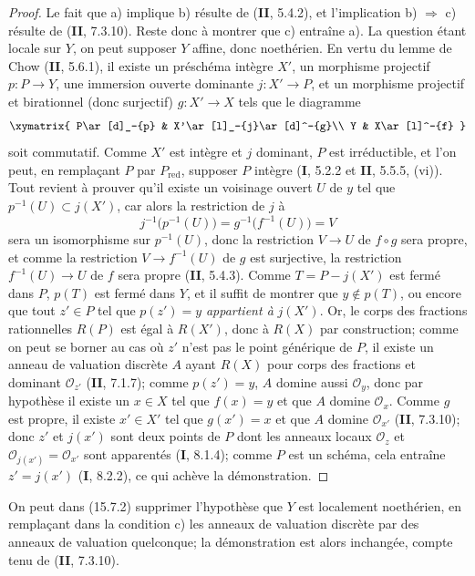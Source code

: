 \begin{proof}
Le fait que a) implique b) résulte de (\textbf{II}, 5.4.2), et l'implication b) $\Rightarrow$ c) résulte de (\textbf{II}, 7.3.10). Reste donc à montrer que c) entraîne a). La question étant locale sur $Y$, on peut supposer $Y$ affine, donc noethérien. En vertu du lemme de Chow (\textbf{II}, 5.6.1), il existe un préschéma intègre $X'$, un morphisme projectif $p:P\to Y$, une immersion ouverte dominante $j:X'\to P$, et un morphisme projectif et birationnel (donc surjectif) $g:X'\to X$ tels que le diagramme
\[
\xymatrix{
P\ar[d]_-{p} & X'\ar[l]_-{j}\ar[d]^-{g}\\
Y & X\ar[l]^-{f}
}
\]
soit commutatif. Comme $X'$ est intègre et $j$ dominant, $P$ est irréductible, et l'on peut, en remplaçant $P$ par $P_{\mathrm{red}}$, supposer $P$ intègre (\textbf{I}, 5.2.2 et \textbf{II}, 5.5.5, (vi)). Tout revient à prouver qu'il existe un voisinage ouvert $U$ de $y$ tel que $p^{-1}(U)\subset j(X')$, car alors la restriction de $j$ à
\[
j^{-1}\bigl(p^{-1}(U)\bigr)=g^{-1}\bigl(f^{-1}(U)\bigr)=V
\]
sera un isomorphisme sur $p^{-1}(U)$, donc la restriction $V\to U$ de $f\circ g$ sera propre, et comme la restriction $V\to f^{-1}(U)$ de $g$ est surjective, la restriction $f^{-1}(U)\to U$ de $f$ sera propre (\textbf{II}, 5.4.3). Comme $T=P-j(X')$ est fermé dans $P$, $p(T)$ est fermé dans $Y$, et il suffit de montrer que $y\notin p(T)$, ou encore que tout $z'\in P$ tel que $p(z')=y$ \emph{appartient à} $j(X')$. Or, le corps des fractions rationnelles $R(P)$ est égal à $R(X')$, donc à $R(X)$ par construction; comme on peut se borner au cas où $z'$ n'est pas le point générique de $P$, il existe un anneau de valuation discrète $A$ ayant $R(X)$ pour corps des fractions et dominant $\mathcal O_{z'}$ (\textbf{II}, 7.1.7); comme $p(z')=y$, $A$ domine aussi $\mathcal O_y$, donc par hypothèse il existe un $x\in X$ tel que $f(x)=y$ et que $A$ domine $\mathcal O_x$. Comme $g$ est propre, il existe $x'\in X'$ tel que $g(x')=x$ et que $A$ domine $\mathcal O_{x'}$ (\textbf{II}, 7.3.10); donc $z'$ et $j(x')$ sont deux points de $P$ dont les anneaux locaux $\mathcal O_z$ et $\mathcal O_{j(x')}=\mathcal O_{x'}$ sont apparentés (\textbf{I}, 8.1.4); comme $P$ est un schéma, cela entraîne $z'=j(x')$ (\textbf{I}, 8.2.2), ce qui achève la démonstration.
\end{proof}

\begin{remark}[15.7.3]
\label{IV.15.7.3-fr}
On peut dans (15.7.2) supprimer l'hypothèse que $Y$ est localement noethérien, en remplaçant dans la condition c) les anneaux de valuation discrète par des anneaux de valuation quelconque; la démonstration est alors inchangée, compte tenu de (\textbf{II}, 7.3.10).
\end{remark}

